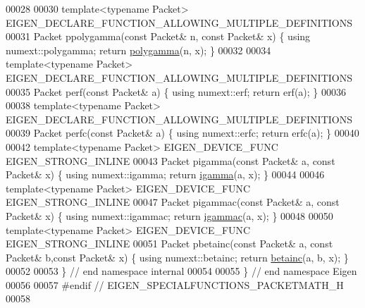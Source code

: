 \begin{DoxyCode}
00028 
00030 \textcolor{keyword}{template}<\textcolor{keyword}{typename} Packet> EIGEN\_DECLARE\_FUNCTION\_ALLOWING\_MULTIPLE\_DEFINITIONS
00031 Packet ppolygamma(\textcolor{keyword}{const} Packet& n, \textcolor{keyword}{const} Packet& x) \{ \textcolor{keyword}{using} numext::polygamma; \textcolor{keywordflow}{return} 
      \hyperlink{namespace_eigen_ae3b47a13a0699f5dbaa0623c11333dca}{polygamma}(n, x); \}
00032 
00034 \textcolor{keyword}{template}<\textcolor{keyword}{typename} Packet> EIGEN\_DECLARE\_FUNCTION\_ALLOWING\_MULTIPLE\_DEFINITIONS
00035 Packet perf(\textcolor{keyword}{const} Packet& a) \{ \textcolor{keyword}{using} numext::erf; \textcolor{keywordflow}{return} erf(a); \}
00036 
00038 \textcolor{keyword}{template}<\textcolor{keyword}{typename} Packet> EIGEN\_DECLARE\_FUNCTION\_ALLOWING\_MULTIPLE\_DEFINITIONS
00039 Packet perfc(\textcolor{keyword}{const} Packet& a) \{ \textcolor{keyword}{using} numext::erfc; \textcolor{keywordflow}{return} erfc(a); \}
00040 
00042 \textcolor{keyword}{template}<\textcolor{keyword}{typename} Packet> EIGEN\_DEVICE\_FUNC EIGEN\_STRONG\_INLINE
00043 Packet pigamma(\textcolor{keyword}{const} Packet& a, \textcolor{keyword}{const} Packet& x) \{ \textcolor{keyword}{using} numext::igamma; \textcolor{keywordflow}{return} 
      \hyperlink{namespace_eigen_af5aa651137636b1cdbd27de1cfe91148}{igamma}(a, x); \}
00044 
00046 \textcolor{keyword}{template}<\textcolor{keyword}{typename} Packet> EIGEN\_DEVICE\_FUNC EIGEN\_STRONG\_INLINE
00047 Packet pigammac(\textcolor{keyword}{const} Packet& a, \textcolor{keyword}{const} Packet& x) \{ \textcolor{keyword}{using} numext::igammac; \textcolor{keywordflow}{return} 
      \hyperlink{namespace_eigen_a1abaa2ff8c7b1871eaf026a47c6bbf3b}{igammac}(a, x); \}
00048 
00050 \textcolor{keyword}{template}<\textcolor{keyword}{typename} Packet> EIGEN\_DEVICE\_FUNC EIGEN\_STRONG\_INLINE
00051 Packet pbetainc(\textcolor{keyword}{const} Packet& a, \textcolor{keyword}{const} Packet& b,\textcolor{keyword}{const} Packet& x) \{ \textcolor{keyword}{using} numext::betainc; \textcolor{keywordflow}{return} 
      \hyperlink{namespace_eigen_a726eae91d4e91d8e25cbe55fffa6a92f}{betainc}(a, b, x); \}
00052 
00053 \} \textcolor{comment}{// end namespace internal}
00054 
00055 \} \textcolor{comment}{// end namespace Eigen}
00056 
00057 \textcolor{preprocessor}{#endif // EIGEN\_SPECIALFUNCTIONS\_PACKETMATH\_H}
00058 
\end{DoxyCode}

